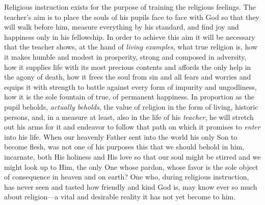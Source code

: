 Religious instruction exists for the purpose of training the religious feelings. The teacher’s aim is to place the souls of his pupils face to face with God so that they will walk before him, measure everything by his standard, and find
joy and happiness only in his fellowship. In order to achieve this aim it will be necessary that the teacher shows, at the hand of \emph{living examples}, what true religion is, how it makes humble and modest in prosperity, strong and composed in adversity, how it supplies life with its most precious contents and affords the only help in the agony of death, how it frees the soul from sin and all fears and worries and equips it with strength to battle against every form of impurity and ungodliness, how it is the sole fountain of true, of permanent happiness. In proportion as the pupil beholds, \emph{actually beholds}, the value of religion in the form of living, historic persons, and, in a measure at least, also in the life of his \emph{teacher}, he will stretch out his arms for it and endeavor to follow that path on which it promises to \emph{enter} into his life. When our heavenly Father sent into the world his only Son to become flesh, was not one of his purposes this that we should behold in him, incarnate, both His holiness and His love so that our soul might be stirred and we might look up to Him, the only One whose pardon, whose favor is the sole object of consequence in heaven and on earth? One who, during religious instruction, has never seen and tasted how friendly and kind God is, may know ever so much about religion—a vital and desirable reality it has not yet become to him.

